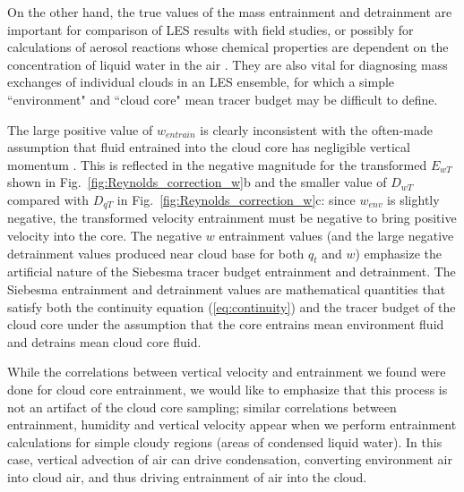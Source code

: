 \documentclass[12pt]{article}
\begin{document}
On the other hand, the true values of the mass entrainment and detrainment are
important for comparison of LES results with field studies, or possibly for
calculations of aerosol reactions whose chemical properties are dependent on the
concentration of liquid water in the air \citep{Hoppel1994}.  They are also 
vital for diagnosing mass exchanges of individual clouds in an LES ensemble, 
for which a simple ``environment" and ``cloud core" mean tracer budget may be
difficult to define.

The large positive value of $w_{entrain}$ is clearly inconsistent with the
often-made assumption that fluid entrained into the cloud core has negligible
vertical momentum \citep{Simpson1969,Gregory2001,Siebesma2003}.  This is
reflected in the negative magnitude for the transformed $E_{wT}$ shown in 
Fig.~\ref{fig:Reynolds_correction_w}b 
and the smaller value of 
$D_{wT}$ compared with $D_{qT}$ in Fig.~\ref{fig:Reynolds_correction_w}c: 
since $w_{env}$ is slightly negative, the
transformed velocity entrainment must be negative to bring positive velocity 
into the core.  The negative $w$ entrainment values (and the large negative
detrainment values produced near cloud base for both $q_t$ and $w$) emphasize 
the artificial nature of the Siebesma tracer budget entrainment and 
detrainment.  The Siebesma entrainment and detrainment values are mathematical
quantities that satisfy both the continuity equation (\ref{eq:continuity}) and
the tracer budget of the cloud core under the assumption that the core entrains
mean environment fluid and detrains mean cloud core fluid.

While the correlations between vertical velocity and entrainment we
found were done for cloud core entrainment, we would like to emphasize
that this process is not an artifact of the cloud core sampling;
similar correlations between entrainment, humidity and vertical
velocity appear when we perform entrainment calculations for simple
cloudy regions (areas of condensed liquid water).  In this case,
vertical advection of air can drive condensation, converting
environment air into cloud air, and thus driving entrainment of air
into the cloud.
\end{document}
